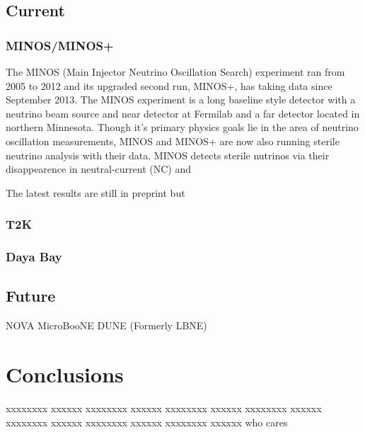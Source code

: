 \documentclass[aps,prd,twocolumn,nofootinbib]{revtex4-1}
\begin{document}
\subsection{Current}
\subsubsection{MINOS/MINOS+}
The MINOS (Main Injector Neutrino Oscillation Search) experiment ran from 2005 to 2012 and its upgraded second run, MINOS+, has taking data since September 2013. The MINOS experiment is a long baseline style detector with a neutrino beam source and near detector at Fermilab and a far detector located in northern Minnesota. Though it's primary physics goals lie in the area of neutrino oscillation measurements, MINOS and MINOS+ are now also running sterile neutrino analysis with their data. MINOS detects sterile nutrinos via their disappearence in neutral-current (NC) and 

The latest results \cite{MINOS+} are still in preprint but 

\subsubsection{T2K}

\subsubsection{Daya Bay}


\subsection{Future}
NOVA
MicroBooNE
DUNE (Formerly LBNE)


\section{Conclusions}
xxxxxxxx xxxxxx xxxxxxxx xxxxxx xxxxxxxx xxxxxx xxxxxxxx xxxxxx xxxxxxxx xxxxxx xxxxxxxx xxxxxx xxxxxxxx xxxxxx
who cares
\end{document}
